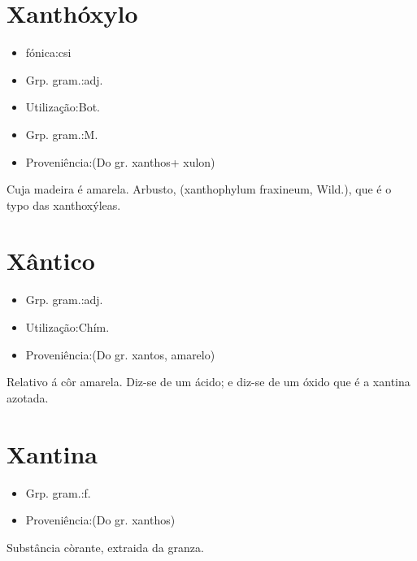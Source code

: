 \section{Xanthóxylo}
\begin{itemize}
\item {fónica:csi}
\end{itemize}
\begin{itemize}
\item {Grp. gram.:adj.}
\end{itemize}
\begin{itemize}
\item {Utilização:Bot.}
\end{itemize}
\begin{itemize}
\item {Grp. gram.:M.}
\end{itemize}
\begin{itemize}
\item {Proveniência:(Do gr. \textunderscore xanthos\textunderscore  + \textunderscore xulon\textunderscore )}
\end{itemize}
Cuja madeira é amarela.
Arbusto, (\textunderscore xanthophylum fraxineum\textunderscore , Wild.), que é o typo das xanthoxýleas.
\section{Xântico}
\begin{itemize}
\item {Grp. gram.:adj.}
\end{itemize}
\begin{itemize}
\item {Utilização:Chím.}
\end{itemize}
\begin{itemize}
\item {Proveniência:(Do gr. \textunderscore xantos\textunderscore , amarelo)}
\end{itemize}
Relativo á côr amarela.
Diz-se de um ácido; e diz-se de um óxido que é a xantina azotada.
\section{Xantina}
\begin{itemize}
\item {Grp. gram.:f.}
\end{itemize}
\begin{itemize}
\item {Proveniência:(Do gr. \textunderscore xanthos\textunderscore )}
\end{itemize}
Substância còrante, extraida da granza.
